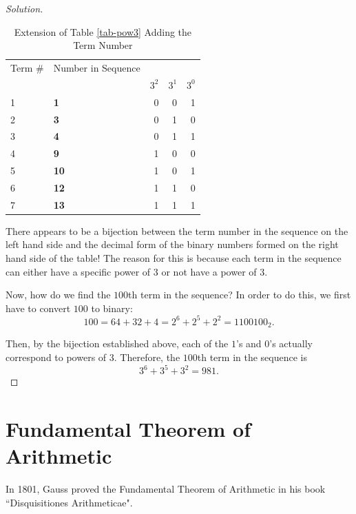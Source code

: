 \begin{proof}[Solution]
\begin{table}[h]
	\centering
	\begin{tabular}{|l|l | r r r|}
		\toprule
		Term \# & Number in Sequence & & &\\
		& & $3^2$ & $3^1$ & $3^0$ \\ 
		\midrule
		1&\textbf{1} & 0 & 0 & 1 \\
		2&\textbf{3} & 0 & 1 & 0 \\
		3&\textbf{4} & 0 & 1 & 1 \\
		4&\textbf{9} & 1 & 0 & 0 \\
		5&\textbf{10} & 1 & 0 & 1 \\
		6&\textbf{12} & 1 & 1 & 0 \\
		7&\textbf{13} & 1 & 1 & 1 \\
		\bottomrule
	\end{tabular}
	\caption{Extension of Table \ref{tab-pow3} Adding the Term Number}
\end{table}

\clearpage

There appears to be a bijection between the term number in the sequence on the left hand side and the decimal form of the binary numbers formed on the right hand side of the table! The reason for this is because each term in the sequence can either have a specific power of $3$ or not have a power of $3$. 

Now, how do we find the $100$th term in the sequence? In order to do this, we first have to convert $100$ to binary: $$100=64+32+4=2^6+2^5+2^2=1100100_2.$$  

Then, by the bijection established above, each of the $1$'s and $0$'s actually correspond to powers of $3$. Therefore, the $100$th term in the sequence is $$3^6+3^5+3^2=\boxed{981}.$$  \end{proof}



\clearpage



\section{Fundamental Theorem of Arithmetic}

In 1801, Gauss proved the Fundamental Theorem of Arithmetic in his book ``Disquisitiones Arithmeticae". 



